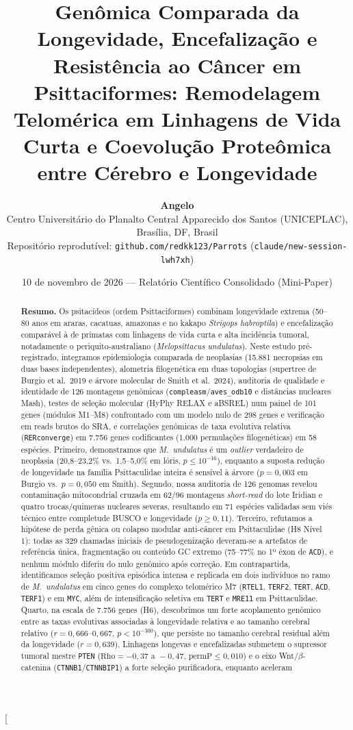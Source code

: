 \documentclass[10pt,a4paper,twocolumn]{article}
\title{\vspace{-0.8cm}\textbf{\Large Genômica Comparada da Longevidade, Encefalização e Resistência ao Câncer em Psittaciformes: Remodelagem Telomérica em Linhagens de Vida Curta e Coevolução Proteômica entre Cérebro e Longevidade}}
\author{
\textbf{Angelo}\\
\small Centro Universitário do Planalto Central Apparecido dos Santos (UNICEPLAC), Brasília, DF, Brasil\\
\small Repositório reprodutível: \texttt{github.com/redkk123/Parrots} (\texttt{claude/new-session-lwh7xh})
}
\date{\small 10 de novembro de 2026 — Relatório Científico Consolidado (Mini-Paper)}
\begin{document}
\twocolumn[{
  \begin{@twocolumnfalse}
    \maketitle
    \vspace{-0.4cm}
    \begin{abstract}
    \noindent \textbf{Resumo.} Os psitacídeos (ordem Psittaciformes) combinam longevidade extrema (50--80 anos em araras, cacatuas, amazonas e no kakapo \textit{Strigops habroptila}) e encefalização comparável à de primatas com linhagens de vida curta e alta incidência tumoral, notadamente o periquito-australiano (\textit{Melopsittacus undulatus}). Neste estudo pré-registrado, integramos epidemiologia comparada de neoplasias (15.881 necropsias em duas bases independentes), alometria filogenética em duas topologias (supertree de Burgio et al.\ 2019 e árvore molecular de Smith et al.\ 2024), auditoria de qualidade e identidade de 126 montagens genômicas (\texttt{compleasm}/\texttt{aves\_odb10} e distâncias nucleares Mash), testes de seleção molecular (HyPhy RELAX e aBSREL) num painel de 101 genes (módulos M1--M8) confrontado com um modelo nulo de 298 genes e verificação em reads brutos do SRA, e correlações genômicas de taxa evolutiva relativa (\texttt{RERconverge}) em 7.756 genes codificantes (1.000 permulações filogenéticas) em 58 espécies. Primeiro, demonstramos que \textit{M.\ undulatus} é um \textit{outlier} verdadeiro de neoplasia (20,8--23,2\% vs.\ 1,5--5,0\% em lóris, $p \le 10^{-16}$), enquanto a suposta redução de longevidade na família Psittaculidae inteira é sensível à árvore ($p = 0,003$ em Burgio vs.\ $p = 0,050$ em Smith). Segundo, nossa auditoria de 126 genomas revelou contaminação mitocondrial cruzada em 62/96 montagens \textit{short-read} do lote Iridian e quatro trocas/quimeras nucleares severas, resultando em 71 espécies validadas sem viés técnico entre completude BUSCO e longevidade ($p \ge 0,11$). Terceiro, refutamos a hipótese de perda gênica ou colapso modular anti-câncer em Psittaculidae (H8 Nível 1): todas as 329 chamadas iniciais de pseudogenização deveram-se a artefatos de referência única, fragmentação ou conteúdo GC extremo (75--77\% no 1º éxon de \texttt{ACD}), e nenhum módulo diferiu do nulo genômico após correção. Em contrapartida, identificamos seleção positiva episódica intensa e replicada em dois indivíduos no ramo de \textit{M.\ undulatus} em cinco genes do complexo telomérico M7 (\texttt{RTEL1}, \texttt{TERF2}, \texttt{TERT}, \texttt{ACD}, \texttt{TERF1}) e em \texttt{MYC}, além de intensificação seletiva em \texttt{TERT} e \texttt{MRE11} em Psittaculidae. Quarto, na escala de 7.756 genes (H6), descobrimos um forte acoplamento genômico entre as taxas evolutivas associadas à longevidade relativa e ao tamanho cerebral relativo ($r = 0,666\text{--}0,667$, $p < 10^{-300}$), que persiste no tamanho cerebral residual além da longevidade ($r = 0,639$). Linhagens longevas e encefalizadas submetem o supressor tumoral mestre \texttt{PTEN} ($\text{Rho} = -0,37\text{ a }-0,47$, $\text{permP} \le 0,010$) e o eixo Wnt/$\beta$-catenina (\texttt{CTNNB1}/\texttt{CTNNBIP1}) a forte seleção purificadora, enquanto aceleram 
\end{abstract}
\end{@twocolumnfalse}}
\end{document}
